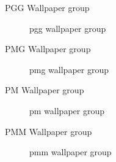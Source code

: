 \documentclass{beamer}
\theoremstyle{definition}
\begin{document}
\begin{frame}{PGG Wallpaper group}
    \begin{figure}
        \centering
        
        \caption{pgg wallpaper group}
        \label{fig:pgg}
    \end{figure}
\end{frame}

\begin{frame}{PMG Wallpaper group}
    \begin{figure}
        \centering
        
        \caption{pmg wallpaper group}
        \label{fig:pmg}
    \end{figure}
\end{frame}

\begin{frame}{PM Wallpaper group}
    \begin{figure}
        \centering
        
        \caption{pm wallpaper group}
        \label{fig:pmm}
    \end{figure}
\end{frame}

\begin{frame}{PMM Wallpaper group}
    \begin{figure}
        \centering
        
        \caption{pmm wallpaper group}
        \label{fig:pmm}
    \end{figure}
\end{frame}
\end{document}
